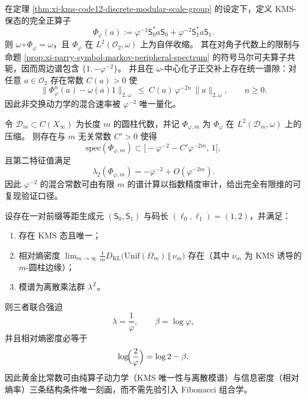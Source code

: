 \begin{theorem}\label{thm:xi-kms-transfer-operator-spectral-gap-explicit}
在定理 \ref{thm:xi-kms-code12-discrete-modular-scale-group} 的设定下，定义 KMS-保态的完全正算子
\[
\Phi_{\varphi}(a):=\varphi^{-1}\mathsf{S}_0^\ast a\mathsf{S}_0+\varphi^{-2}\mathsf{S}_1^\ast a\mathsf{S}_1.
\]
则 \(\omega\circ\Phi_{\varphi}=\omega\)，且 \(\Phi_{\varphi}\) 在 \(L^2(\mathcal{O}_2,\omega)\) 上为自伴收缩。
其在对角子代数上的限制与命题 \ref{prop:xi-parry-symbol-markov-peripheral-spectrum} 的符号马尔可夫算子共轭，因而周边谱包含 \(\{1,-\varphi^{-2}\}\)。
并且在 \(\omega\)-中心化子正交补上存在统一谱隙：对任意 \(a\in\mathcal{O}_2\) 存在常数 \(C(a)>0\) 使
\[
\|\Phi_{\varphi}^n(a)-\omega(a)1\|_{2,\omega}\ \le\ C(a)\,\varphi^{-2n}\,\|a\|_{2,\omega},
\qquad n\ge 0.
\]
因此非交换动力学的混合速率被 \(\varphi^{-2}\) 唯一量化。
\end{theorem}

\begin{proposition}\label{prop:xi-finite-truncation-spectrum-converges}
令 \(\mathcal D_m\subset C(X_\infty)\) 为长度 \(m\) 的圆柱代数，并记 \(\Phi_{\varphi,m}\) 为 \(\Phi_\varphi\) 在 \(L^2(\mathcal D_m,\omega)\) 上的压缩。
则存在与 \(m\) 无关常数 \(C'>0\) 使得
\[
\mathrm{spec}(\Phi_{\varphi,m})\subset\bigl[-\varphi^{-2}-C'\varphi^{-2m},\,1\bigr],
\]
且第二特征值满足
\[
\lambda_2(\Phi_{\varphi,m})=-\varphi^{-2}+O(\varphi^{-2m}).
\]
因此 \(\varphi^{-2}\) 的混合常数可由有限 \(m\) 的谱计算以指数精度审计，给出完全有限维的可复现验证口径。
\end{proposition}

\begin{theorem}\label{thm:xi-phi-rigidity-from-kms-entropy-density}
设存在一对前缀等距生成元 \((\mathsf{S}_0,\mathsf{S}_1)\) 与码长 \((\ell_0,\ell_1)=(1,2)\)，并满足：
\begin{enumerate}
  \item 存在 KMS 态且唯一；
  \item 相对熵密度
  \(\displaystyle \lim_{m\to\infty}\frac{1}{m}D_{\mathrm{KL}}\bigl(\mathrm{Unif}(\Omega_m)\,\Vert\,\nu_m\bigr)\)
  存在（其中 \(\nu_m\) 为 KMS 诱导的 \(m\)-圆柱边缘）；
  \item 模谱为离散乘法群 \(\lambda^{\mathbb Z}\)。
\end{enumerate}
则三者联合强迫
\[
\lambda=\frac{1}{\varphi},
\qquad
\beta=\log\varphi,
\]
并且相对熵密度必等于
\[
\log\!\Bigl(\frac{2}{\varphi}\Bigr)=\log 2-\beta.
\]
因此黄金比常数可由纯算子动力学（KMS 唯一性与离散模谱）与信息密度（相对熵率）三条结构条件唯一刻画，而不需先验引入 Fibonacci 组合学。
\end{theorem}

